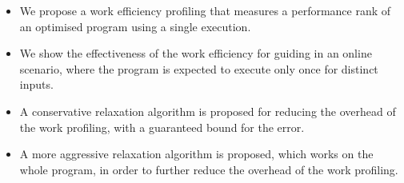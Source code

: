     \begin{itemize}[leftmargin=3mm]

        \item We propose a work efficiency profiling that measures a performance rank of an optimised program using a single execution.

        \item We show the effectiveness of the work efficiency for guiding {\itercomp} in an online scenario, where the program is expected
        to execute only once for distinct inputs.

        \item A conservative relaxation algorithm is proposed for reducing the overhead of the work profiling, with a guaranteed bound for
        the error.

        \item A more aggressive relaxation algorithm is proposed, which works on the whole program, in order to further reduce the overhead
        of the work profiling.

    \end{itemize}

